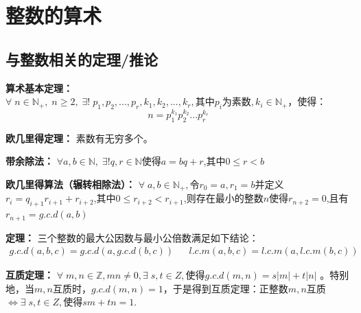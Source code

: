 \documentclass[zihao=-4,UTF8]{report}
\begin{document}
\section{整数的算术}

\subsection{与整数相关的定理/推论}

\textbf{算术基本定理：}
$\forall\;n\in \mathbb{N}_{+},\;n\ge 2,\;\exists \text{!}\;p_{1},p_{2},...,p_{r},k_{1},k_{2},...,k_{r},\text{其中}p_{i}\text{为素数}, k_{i}\in  \mathbb{N}_{+}$，使得：
\begin{equation*}
    n=p_{1}^{k_{1}}p_{2}^{k_{2}}...p_{r}^{k_{r}}
\end{equation*}


\textbf{欧几里得定理：}
素数有无穷多个。

\textbf{带余除法：}
$\forall a,b\in \mathbb{N},\;\exists \text{!}q,r\in  \mathbb{N}$使得$a=bq+r$,其中$0\le r < b$

\textbf{欧几里得算法（辗转相除法）：}
$\forall\; a,b\in \mathbb{N}_{+},$令$r_{0}=a,r_{1}=b$并定义$r_{i}=q_{i+1}r_{i+1}+r_{i+2}$,其中$0\le r_{i+2}< r_{i+1}$,则存在最小的整数$n$使得$r_{n+2}=0$,且有$r_{n+1}=g.c.d(a,b)$



\textbf{定理：}
三个整数的最大公因数与最小公倍数满足如下结论：
\begin{align*}
    g.c.d(a,b,c)=g.c.d(a,g.c.d(b,c))&&l.c.m(a,b,c)=l.c.m(a,l.c.m(b,c))
\end{align*}

\textbf{互质定理：}
$\forall \;m,n\in \mathbb{Z},mn\ne 0,\exists\; s,t\in Z,$使得$g.c.d(m,n)=s\left | m \right |+t\left | n \right | $
。特别地，当$m,n$互质时，$g.c.d(m,n)=1$，于是得到互质定理：正整数$m,n$互质$\Longleftrightarrow \exists\; s,t\in Z,$使得$sm+tn=1 .$\par
\end{document}
